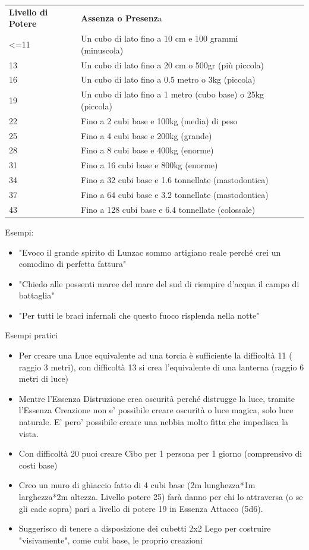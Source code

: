 \documentclass[a4paper,11pt,twoside,openany]{book}
\begin{document}
\begin{tabularx}{\textwidth}{lXlXX}
	\toprule
	\textbf{Livello di Potere} & \textbf{Assenza o Presenz}a\tabularnewline
	\textless=11     & Un cubo di lato fino a 10 cm e 100 grammi (minuscola)\tabularnewline
	13               & Un cubo di lato fino a 20 cm o 500gr (più piccola)\tabularnewline
	16               & Un cubo di lato fino a 0.5 metro o 3kg (piccola)\tabularnewline
	19               & Un cubo di lato fino a 1 metro (cubo base) o 25kg (piccola)\tabularnewline
	22               & Fino a 2 cubi base e 100kg (media) di peso\tabularnewline
	25               & Fino a 4 cubi base e 200kg (grande)\tabularnewline
	28               & Fino a 8 cubi base e 400kg (enorme)\tabularnewline
	31               & Fino a 16 cubi base e 800kg (enorme)\tabularnewline
	34               & Fino a 32 cubi base e 1.6 tonnellate (mastodontica)\tabularnewline
	37               & Fino a 64 cubi base e 3.2 tonnellate (mastodontica)\tabularnewline
	43               & Fino a 128 cubi base e 6.4 tonnellate (colossale)\tabularnewline
\end{tabularx}

\bigskip

Esempi:
\begin{itemize}
	\item "Evoco il grande spirito di Lunzac sommo artigiano reale perché crei un comodino di perfetta fattura"
	\item "Chiedo alle possenti maree del mare del sud di riempire d'acqua il campo di battaglia"
	\item "Per tutti le braci infernali che questo fuoco risplenda nella notte"
\end{itemize}

\bigskip

Esempi pratici
\begin{itemize}
	\item Per creare una Luce equivalente ad una torcia è sufficiente la difficoltà 11 ( raggio 3 metri), con difficoltà 13 si crea l'equivalente di una lanterna (raggio 6 metri di luce)
	\item Mentre l'Essenza Distruzione crea oscurità perché distrugge la luce, tramite l'Essenza Creazione non e' possibile creare oscurità o luce magica, solo luce naturale. E' pero' possibile creare una nebbia molto fitta che impedisca la vista.
	\item Con difficoltà 20 puoi creare Cibo per 1 persona per 1 giorno (comprensivo di costi base)
	\item Creo un muro di ghiaccio fatto di 4 cubi base (2m lunghezza{*}1m larghezza{*}2m altezza. Livello potere 25) farà danno per chi lo attraversa (o se gli cade sopra) pari a livello di potere 19 in Essenza Attacco (5d6).
	\item Suggerisco di tenere a disposizione dei cubetti 2x2 Lego per costruire "visivamente", come cubi base, le proprio creazioni
\end{itemize}
\end{document}
